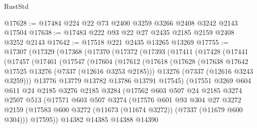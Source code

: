 \begin{lexlean}{RustStd}
\begin{coremodule}
@17628 := @17484 @224 @22 @73 @2400 @3259 @3266 @2408 @3242 @2143 @17504
@17638 := @17483 @222 @93 @22 @27 @2435 @2185 @2159 @2408 @3252 @2143
@17642 := @17518 @221 @2435 @13265 @13269
@17755 := @17307
    (@17329
      (@17368
        (@17370
          (@17372
            (@17393
              (@17411
                (@17428
                  (@17441
                    (@17457
                      (@17461
                        (@17547
                          (@17604
                            (@17612
                              (@17618
                                (@17628
                                  (@17638 @17642 @17525 @13276 (@7337 (@12616 @3253 @2185)))
                                  @13276
                                  (@7337 (@12616 @3243 @3259)))
                                @13776
                                @13779
                                @13782
                                @13786
                                @13791
                                @17545)
                              (@17551
                                @3269
                                @604
                                @611
                                @24
                                @2185
                                @3276
                                @2185
                                @3284
                                (@17562
                                  @603
                                  @507
                                  @24
                                  @2185
                                  @3274
                                  @2507
                                  @513
                                  (@17571
                                    @603
                                    @507
                                    @3274
                                    (@17576
                                      @601
                                      @93
                                      @304
                                      @27
                                      @3272
                                      @2159
                                      (@17583
                                        @600
                                        @3272
                                        (@11673 (@11674 @3272))
                                        (@7337 (@11679 @600 @304)))
                                      @17595))
                                  @14382
                                  @14385
                                  @14388
                                  @14390

\end{coremodule}
\end{lexlean}
